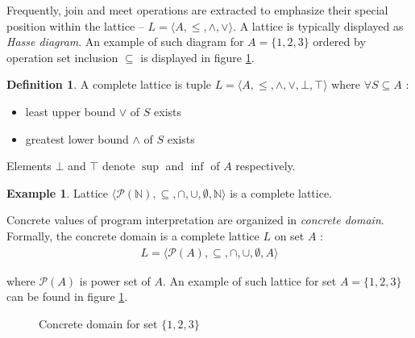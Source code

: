 \documentclass[12pt,final,oneside]{fithesis2}
\theoremstyle{definition}
\newtheorem{definition}{Definition}[chapter]
\newtheorem{example}{Example}[chapter]
\begin{document}
Frequently, join and meet operations are extracted to emphasize their
special position within the lattice --
$L = \langle A, \leq, \land, \lor \rangle$.
A lattice is typically displayed as \textit{Hasse diagram}. An example
of such diagram for $A = \{ 1, 2, 3\}$ ordered by operation set inclusion
$\subseteq$ is displayed in figure \ref{fig:concretedomain}.

\begin{definition}
A complete lattice is tuple $L = \langle A, \leq, \land, \lor, \bot, \top \rangle$
where $\forall S \subseteq A$ :

\begin{itemize}
\item least upper bound $\lor$ of $S$ exists
\item greatest lower bound $\land$ of $S$ exists
\end{itemize}

Elements $\bot$ and $\top$ denote $\sup$ and $\inf$ of $A$ respectively.
\end{definition}

\begin{example}
Lattice $\langle \mathcal{P}(\mathbb{N}), \subseteq, \cap, \cup, \emptyset, \mathbb{N} \rangle$
is a complete lattice.
\end{example}

Concrete values of program interpretation are organized in \textit{concrete
domain}. Formally, the concrete domain is a complete lattice $L$ on set
$A$ \cite{Constantini11-1}:
\begin{align*}
L = \langle \mathcal{P} (A), \subseteq, \cap, \cup, \emptyset, A \rangle
\end{align*}

where $\mathcal{P} (A)$ is power set of $A$. An example of such lattice
for set $A = \{ 1, 2, 3 \}$ can be found in figure \ref{fig:concretedomain}.

\begin{figure}[ht]
\centering
{}
\caption{Concrete domain for set $\{ 1, 2, 3 \}$}
\label{fig:concretedomain}
\end{figure}
\end{document}
